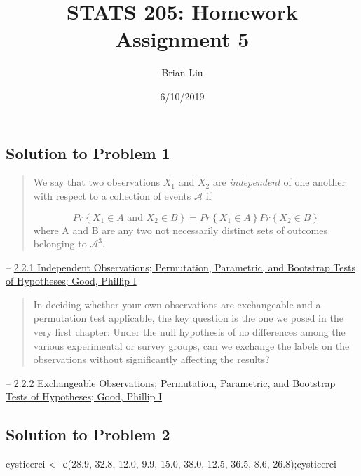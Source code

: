 \documentclass[]{article}
\title{STATS 205: Homework Assignment 5}
\author{Brian Liu}
\date{6/10/2019}
\newenvironment{Shaded}{\begin{snugshade}}{\end{snugshade}}
\newcommand{\FloatTok}[1]{\textcolor[rgb]{0.00,0.00,0.81}{#1}}
\newcommand{\KeywordTok}[1]{\textcolor[rgb]{0.13,0.29,0.53}{\textbf{#1}}}
\newcommand{\NormalTok}[1]{#1}
\newcommand{\StringTok}[1]{\textcolor[rgb]{0.31,0.60,0.02}{#1}}
\begin{document}
\maketitle

\hypertarget{solution-to-problem-1}{%
\subsection{Solution to Problem 1}\label{solution-to-problem-1}}

\begin{quote}
We say that two observations \(X_1\) and \(X_2\) are \emph{independent}
of one another with respect to a collection of events \(\mathcal{A}\) if

\[
    Pr\left\{X_1 \in A \textrm{  and  } X_2 \in B\right\} = Pr\left\{X_1 \in A \right\}Pr\left\{X_2 \in B\right\}
\] where A and B are any two not necessarily distinct sets of outcomes
belonging to \(\mathcal{A}^3\).
\end{quote}

--
\href{http://www.r-tutor.com/elementary-statistics/non-parametric-methods/mann-whitney-wilcoxon-test}{2.2.1
Independent Observations; Permutation, Parametric, and Bootstrap Tests
of Hypotheses; Good, Phillip I}

\begin{quote}
In deciding whether your own observations are exchangeable and a
permutation test applicable, the key question is the one we posed in the
very first chapter: Under the null hypothesis of no differences among
the various experimental or survey groups, can we exchange the labels on
the observations without significantly affecting the results?
\end{quote}

--
\href{http://www.r-tutor.com/elementary-statistics/non-parametric-methods/mann-whitney-wilcoxon-test}{2.2.2
Exchangeable Observations; Permutation, Parametric, and Bootstrap Tests
of Hypotheses; Good, Phillip I}

\hypertarget{solution-to-problem-2}{%
\subsection{Solution to Problem 2}\label{solution-to-problem-2}}

\begin{Shaded}
\begin{Highlighting}[]
\NormalTok{cysticerci <-}\StringTok{ }\KeywordTok{c}\NormalTok{(}\FloatTok{28.9}\NormalTok{, }\FloatTok{32.8}\NormalTok{, }\FloatTok{12.0}\NormalTok{, }\FloatTok{9.9}\NormalTok{, }\FloatTok{15.0}\NormalTok{, }\FloatTok{38.0}\NormalTok{, }\FloatTok{12.5}\NormalTok{, }\FloatTok{36.5}\NormalTok{, }\FloatTok{8.6}\NormalTok{, }\FloatTok{26.8}\NormalTok{);cysticerci}
\end{Highlighting}
\end{Shaded}
\end{document}
